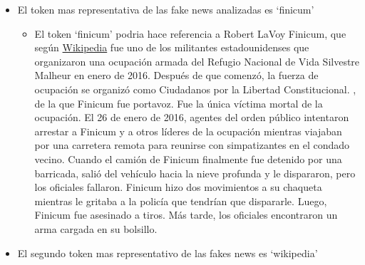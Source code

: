 \documentclass[
  11pt,
  a4paper,
]{article}
\providecommand{\tightlist}{%
  \setlength{\itemsep}{0pt}\setlength{\parskip}{0pt}}
\begin{document}
\begin{itemize}
\item
  El token mas representativa de las fake news analizadas es `finicum'

  \begin{itemize}
  \tightlist
  \item
    El token `finicum' podria hace referencia a Robert LaVoy Finicum,
    que según
    \href{https://en.wikipedia.org/wiki/LaVoy_Finicum}{Wikipedia} fue
    uno de los militantes estadounidenses que organizaron una ocupación
    armada del Refugio Nacional de Vida Silvestre Malheur en enero de
    2016. Después de que comenzó, la fuerza de ocupación se organizó
    como Ciudadanos por la Libertad Constitucional. , de la que Finicum
    fue portavoz. Fue la única víctima mortal de la ocupación. El 26 de
    enero de 2016, agentes del orden público intentaron arrestar a
    Finicum y a otros líderes de la ocupación mientras viajaban por una
    carretera remota para reunirse con simpatizantes en el condado
    vecino. Cuando el camión de Finicum finalmente fue detenido por una
    barricada, salió del vehículo hacia la nieve profunda y le
    dispararon, pero los oficiales fallaron. Finicum hizo dos
    movimientos a su chaqueta mientras le gritaba a la policía que
    tendrían que dispararle. Luego, Finicum fue asesinado a tiros. Más
    tarde, los oficiales encontraron un arma cargada en su bolsillo.
  \end{itemize}
\item
  El segundo token mas representativo de las fakes news es `wikipedia'


\end{itemize}
\end{document}
